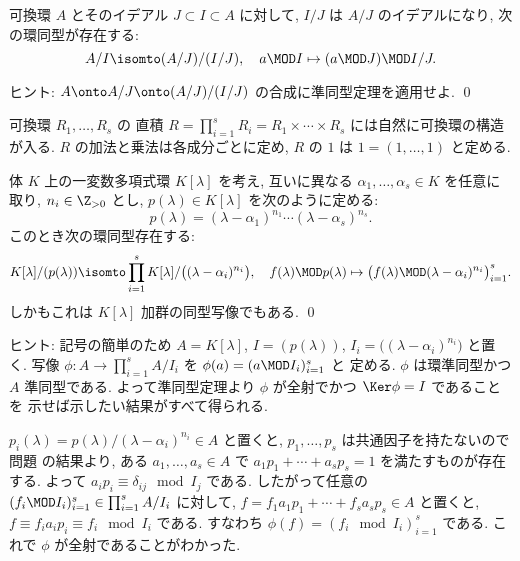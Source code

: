 \documentclass[12pt,twoside]{jarticle}
\begin{document}
\begin{question}[第三同型定理]
\label{q:ring-isom-theorem-3}
  可換環 $A$ とそのイデアル $J\subset I\subset A$ に対して, 
  $I/J$ は $A/J$ のイデアルになり, 次の環同型が存在する:
  \begin{equation*}
    A/I \isomto (A/J)/(I/J),
    \quad
    a\MOD I \mapsto (a\MOD J)\MOD I/J.
  \end{equation*}
\end{question}

\noindent
ヒント: $A\onto A/J\onto (A/J)/(I/J)$ の合成に準同型定理を適用せよ.
\qed

\bigskip

可換環 $R_1,\dots,R_s$ の
直積 $R=\prod_{i=1}^s R_i=R_1\times\cdots\times R_s$ には自然に可換環の構造
が入る.  $R$ の加法と乗法は各成分ごとに定め, $R$ の $1$ は $1=(1,\dots,1)$ 
と定める.


\begin{question}
\label{q:Chinese-remainder-K[x]}
  体 $K$ 上の一変数多項式環 $K[\lambda]$ を考え,
  互いに異なる $\alpha_1,\dots,\alpha_s\in K$ を任意に取り,
  $n_i\in\Z_{>0}$ とし, $p(\lambda)\in K[\lambda]$ を次のように定める:
  \begin{equation*}
    p(\lambda) = (\lambda-\alpha_1)^{n_1}\cdots(\lambda-\alpha_s)^{n_s}.
  \end{equation*}
  このとき次の環同型存在する:
  \begin{equation*}
    K[\lambda]/(p(\lambda)) 
    \isomto 
    \prod_{i=1}^s K[\lambda]/\bigl((\lambda-\alpha_i)^{n_i}\bigr),
    \quad
    f(\lambda)\MOD p(\lambda)
    \mapsto
    \bigl(f(\lambda)\MOD (\lambda-\alpha_i)^{n_i}\bigr)_{i=1}^s.
  \end{equation*}
  しかもこれは $K[\lambda]$ 加群の同型写像でもある. \qed
\end{question}

\noindent
ヒント: 記号の簡単のため $A=K[\lambda]$, $I=(p(\lambda))$, 
$I_i=\bigl((\lambda-\alpha_i)^{n_i}\bigr)$ と置く.
写像 $\phi:A\to\prod_{i=1}^s A/I_i$ を $\phi(a)=(a\MOD I_i)_{i=1}^s$ と
定める.  $\phi$ は環準同型かつ $A$ 準同型である.  
よって準同型定理より $\phi$ が全射でかつ $\Ker\phi=I$ であることを
示せば示したい結果がすべて得られる.  

$p_i(\lambda)=p(\lambda)/(\lambda-\alpha_i)^{n_i}\in A$ と置くと,
$p_1,\dots,p_s$ は共通因子を持たないので
問題  の結果より,
ある $a_1,\dots,a_s\in A$ で $a_1p_1+\cdots+a_sp_s=1$ を満たすものが存在する.
よって $a_ip_i\equiv \delta_{ij}\mod I_j$ である.
したがって任意の $(f_i\MOD I_i)_{i=1}^s\in \prod_{i=1}^s A/I_i$ に対して,
$f=f_1a_1p_1+\cdots+f_sa_sp_s\in A$ と置くと,
$f\equiv f_ia_ip_i\equiv f_i\mod I_i$ である.
すなわち $\phi(f)=(f_i\mod I_i)_{i=1}^s$ である. 
これで $\phi$ が全射であることがわかった.
\end{document}
